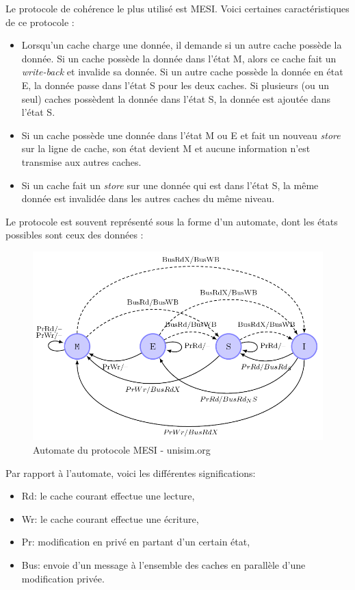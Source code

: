 Le protocole de cohérence le plus utilisé est MESI. Voici certaines caractéristiques de ce protocole : \\
\begin{itemize}
\item Lorsqu'un cache charge une donnée, il demande si un autre cache possède la donnée. Si un cache possède la donnée dans l'état M, alors ce cache fait un \emph{write-back} et invalide sa donnée. Si un autre cache possède la donnée en état E, la donnée passe dans l'état S pour les deux caches. Si plusieurs (ou un seul) caches possèdent la donnée dans l'état S, la donnée est ajoutée dans l'état S.
\item Si un cache possède une donnée dans l'état M ou E et fait un nouveau \textit{store} sur la ligne de cache, son état devient M et aucune information n'est transmise aux autres caches.
\item Si un cache fait un \textit{store} sur une donnée qui est dans l'état S, la même donnée est invalidée dans les autres caches du même niveau. \\
\end{itemize}

Le protocole est souvent représenté sous la forme d'un automate, dont les états possibles sont ceux des données : \\

\begin{figure}[H]
\begin{center}
   \includegraphics[scale=0.45]{images/mesi.png}
   \caption{\label{img:mesi_aut} Automate du protocole MESI - unisim.org}
\end{center}
\end{figure}
Par rapport à l'automate, voici les différentes significations: \\
\begin{itemize}
\item Rd: le cache courant effectue une lecture,
\item Wr: le cache courant effectue une écriture,
\item Pr: modification en privé en partant d'un certain état,
\item Bus: envoie d'un message à l'ensemble des caches en parallèle d'une modification privée. \\
\end{itemize}

